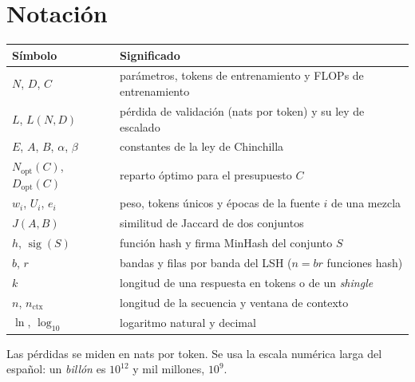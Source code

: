 \documentclass[11pt,a4paper,twoside,openany]{book}
\newcommand{\Nopt}{N_{\mathrm{opt}}}
\newcommand{\Dopt}{D_{\mathrm{opt}}}
\newcommand{\sig}{\operatorname{sig}}
\newcommand{\nctx}{n_{\mathrm{ctx}}}
\begin{document}
\section*{Notación}
\begin{center}
\begin{tabular}{@{}ll@{}}
\toprule
Símbolo & Significado \\
\midrule
$N$, $D$, $C$ & parámetros, tokens de entrenamiento y FLOPs de entrenamiento \\
$L$, $L(N,D)$ & pérdida de validación (nats por token) y su ley de escalado \\
$E$, $A$, $B$, $\alpha$, $\beta$ & constantes de la ley de Chinchilla \\
$\Nopt(C)$, $\Dopt(C)$ & reparto óptimo para el presupuesto $C$ \\
$w_i$, $U_i$, $e_i$ & peso, tokens únicos y épocas de la fuente $i$ de una mezcla \\
$J(A,B)$ & similitud de Jaccard de dos conjuntos \\
$h$, $\sig(S)$ & función hash y firma MinHash del conjunto $S$ \\
$b$, $r$ & bandas y filas por banda del LSH ($n=br$ funciones hash) \\
$k$ & longitud de una respuesta en tokens o de un \emph{shingle} \\
$n$, $\nctx$ & longitud de la secuencia y ventana de contexto \\
$\ln$, $\log_{10}$ & logaritmo natural y decimal \\
\bottomrule
\end{tabular}
\end{center}

Las pérdidas se miden en nats por token. Se usa la escala numérica larga del español: un \emph{billón} es $10^{12}$ y mil millones, $10^{9}$.

\tableofcontents

\mainmatter







\appendix


\backmatter

\end{document}
